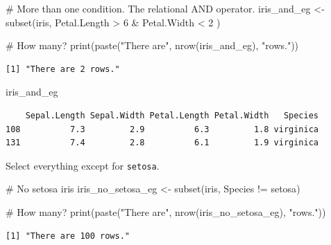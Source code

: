 \documentclass[
  letterpaper,
  DIV=11,
  numbers=noendperiod]{scrreprt}
\newenvironment{Shaded}{\begin{snugshade}}{\end{snugshade}}
\newcommand{\CommentTok}[1]{\textcolor[rgb]{0.37,0.37,0.37}{#1}}
\newcommand{\DecValTok}[1]{\textcolor[rgb]{0.68,0.00,0.00}{#1}}
\newcommand{\FunctionTok}[1]{\textcolor[rgb]{0.28,0.35,0.67}{#1}}
\newcommand{\NormalTok}[1]{\textcolor[rgb]{0.00,0.23,0.31}{#1}}
\newcommand{\OtherTok}[1]{\textcolor[rgb]{0.00,0.23,0.31}{#1}}
\newcommand{\SpecialCharTok}[1]{\textcolor[rgb]{0.37,0.37,0.37}{#1}}
\newcommand{\StringTok}[1]{\textcolor[rgb]{0.13,0.47,0.30}{#1}}
\begin{document}
\begin{Shaded}
\begin{Highlighting}[]
\CommentTok{\# More than one condition. The relational AND operator.}
\NormalTok{iris\_and\_eg }\OtherTok{\textless{}{-}} \FunctionTok{subset}\NormalTok{(iris, Petal.Length }\SpecialCharTok{\textgreater{}} \DecValTok{6} \SpecialCharTok{\&}\NormalTok{ Petal.Width }\SpecialCharTok{\textless{}} \DecValTok{2}\NormalTok{ )}

\CommentTok{\# How many?}
\FunctionTok{print}\NormalTok{(}\FunctionTok{paste}\NormalTok{(}\StringTok{"There are"}\NormalTok{, }\FunctionTok{nrow}\NormalTok{(iris\_and\_eg), }\StringTok{"rows."}\NormalTok{))}
\end{Highlighting}
\end{Shaded}

\begin{verbatim}
[1] "There are 2 rows."
\end{verbatim}

\begin{Shaded}
\begin{Highlighting}[]
\NormalTok{iris\_and\_eg}
\end{Highlighting}
\end{Shaded}

\begin{verbatim}
    Sepal.Length Sepal.Width Petal.Length Petal.Width   Species
108          7.3         2.9          6.3         1.8 virginica
131          7.4         2.8          6.1         1.9 virginica
\end{verbatim}

Select everything except for \texttt{setosa}.

\begin{Shaded}
\begin{Highlighting}[]
\CommentTok{\# No setosa iris}
\NormalTok{iris\_no\_setosa\_eg }\OtherTok{\textless{}{-}} \FunctionTok{subset}\NormalTok{(iris, Species }\SpecialCharTok{!=} \StringTok{\textquotesingle{}setosa\textquotesingle{}}\NormalTok{)}

\CommentTok{\# How many?}
\FunctionTok{print}\NormalTok{(}\FunctionTok{paste}\NormalTok{(}\StringTok{"There are"}\NormalTok{, }\FunctionTok{nrow}\NormalTok{(iris\_no\_setosa\_eg), }\StringTok{"rows."}\NormalTok{))}
\end{Highlighting}
\end{Shaded}

\begin{verbatim}
[1] "There are 100 rows."
\end{verbatim}
\end{document}
